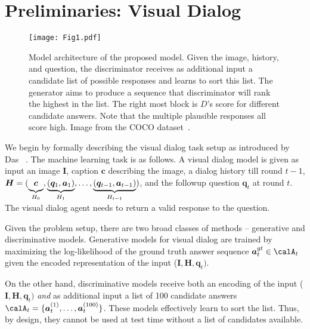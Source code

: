 \documentclass{article}
\begin{document}
 \section{Preliminaries: Visual Dialog}


\begin{figure}[t]
 \centering 
 \texttt{[image: Fig1.pdf]}
 \caption{Model architecture of the proposed model. Given the image, history, and question, the discriminator receives as additional input a candidate list of possible responses and learns to sort this list. The generator aims to produce a sequence that discriminator will rank the highest in the list. The right most block is $D$'s score for different candidate answers. Note that the multiple plausible responses all score high. Image from the COCO dataset~\cite{lin2014microsoft}.}
 \label{fig:teaser}
 \vspace{-4mm}
\end{figure}

We begin by formally describing the visual dialog task setup as introduced by Das \etal~\cite{visdial}.
The machine learning task is as follows. A visual dialog model is given as input an image $\bm{I}$, caption $\bm{c}$ describing the image, 
a dialog history till round $t-1$,  
 $\bm{H} = (\underbrace{\vphantom{(Q_1, A_1)}\bm{c}}_{H_0}, \underbrace{(\bm{q}_1, \bm{a}_1)}_{H_1}, \ldots, \underbrace{ (\bm{q}_{t-1},\bm{a}_{t-1})}_{H_{t-1}})$,  
and the followup question $\bm{q}_t$ at round $t$. The visual dialog agent needs to return a valid response to the question. 

Given the problem setup, there are two broad classes of methods -- generative and discriminative models. 
Generative models for visual dialog are trained by maximizing the log-likelihood of the ground truth answer sequence $\bm{a}^{gt}_t \in \calA_t$
given the encoded representation of the input ($\bm{I}, \bm{H}, \bm{q}_t)$. 

On the other hand, discriminative models  receive both an encoding of the input ($\bm{I}, \bm{H}, \bm{q}_t)$ 
\emph{and} as additional input a list of 100 candidate answers $\calA_t = \{\bm{a}^{(1)}_t, \ldots,\bm{a}^{(100)}_t\}$. These models effectively learn to sort the list. Thus, by design, they cannot be used 
at test time without a list of candidates available. 


 \vspace{-1mm}
\end{document}
